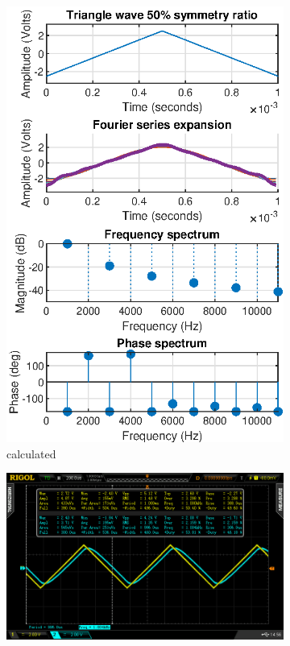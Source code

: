 \documentclass[notitlepage, a4paper, 11pt]{article}
\begin{document}
	\begin{figure}[H]
		\centering
		\begin{subfigure}[][][t]{0.3\textwidth}
			\includegraphics[width=\textwidth]{../Matlab/img/tri50}
			\caption{calculated}
			\label{fig:calc-signals-a}
		\end{subfigure}
		\quad
		\begin{subfigure}[][][t]{0.3\textwidth}
			\includegraphics[width=\textwidth, trim=85 50 112 45, clip]{../img/osc/DS2_QuickPrint2.png}

\end{subfigure}
\end{figure}
\end{document}
